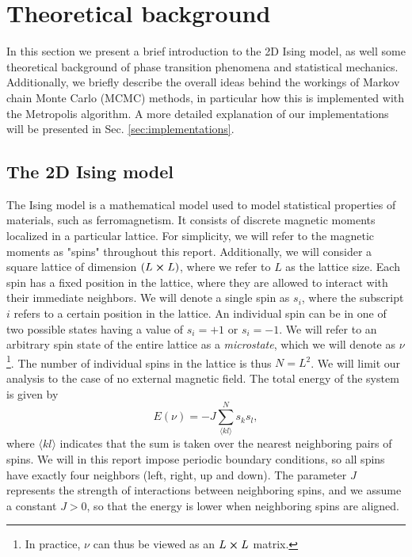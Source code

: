 \section{Theoretical background}\label{sec:theory}

In this section we present a brief introduction to the 2D Ising model, as well some theoretical background of phase transition phenomena and statistical mechanics. Additionally, we briefly describe the overall ideas behind the workings of Markov chain Monte Carlo (MCMC) methods, in particular how this is implemented with the Metropolis algorithm. A more detailed explanation of our implementations will be presented in Sec. \ref{sec:implementations}.    

\subsection{The 2D Ising model}\label{subsec_theory:ising_2d}
The Ising model is a mathematical model used to model statistical properties of materials, such as ferromagnetism. It consists of discrete magnetic moments localized in a particular lattice. For simplicity, we will refer to the magnetic moments as "spins" throughout this report. Additionally, we will consider a square lattice of dimension $(L\cross L)$, where we refer to $L$ as the lattice size. Each spin has a fixed position in the lattice, where they are allowed to interact with their immediate neighbors. We will denote a single spin as $s_i$, where the subscript $i$ refers to a certain position in the lattice. An individual spin can be in one of two possible states having a value of $s_i=+1$ or $s_i=-1$. We will refer to an arbitrary spin state of the entire lattice as a \textit{microstate}, which we will denote as $\nu$\footnote{In practice, $\nu$ can thus be viewed as an $L\cross L$ matrix.}. The number of individual spins in the lattice is thus $N=L^2$. We will limit our analysis to the case of no external magnetic field. The total energy of the system is given by 
\begin{equation} \label{eq:energy}
    E(\nu) = -J \sum_{\langle kl \rangle}^N s_k s_l,
\end{equation}
where $\langle kl\rangle$ indicates that the sum is taken over the nearest neighboring pairs of spins. We will in this report impose periodic boundary conditions, so all spins have exactly four neighbors (left, right, up and down). The parameter $J$ represents the strength of interactions between neighboring spins, and we assume a constant $J>0$, so that the energy is lower when neighboring spins are aligned. 

